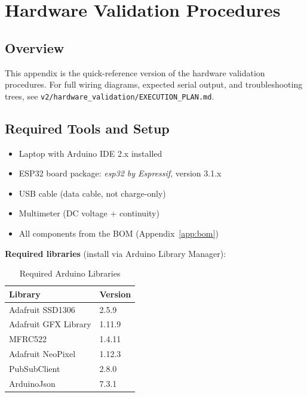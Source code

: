 \chapter{Hardware Validation Procedures}
\label{app:validation}

\section{Overview}

This appendix is the quick-reference version of the hardware validation procedures. For full wiring diagrams, expected serial output, and troubleshooting trees, see \texttt{v2/hardware\_validation/EXECUTION\_PLAN.md}.

\section{Required Tools and Setup}

\begin{itemize}[leftmargin=1.5em]
    \item Laptop with Arduino IDE 2.x installed
    \item ESP32 board package: \textit{esp32 by Espressif}, version 3.1.x
    \item USB cable (data cable, not charge-only)
    \item Multimeter (DC voltage + continuity)
    \item All components from the BOM (Appendix~\ref{app:bom})
\end{itemize}

\textbf{Required libraries} (install via Arduino Library Manager):

\begin{table}[H]
\centering
\caption{Required Arduino Libraries}
\begin{tabular}{L{5cm}C{3cm}}
\toprule
\textbf{Library} & \textbf{Version} \\
\midrule
Adafruit SSD1306 & 2.5.9 \\
Adafruit GFX Library & 1.11.9 \\
MFRC522 & 1.4.11 \\
Adafruit NeoPixel & 1.12.3 \\
PubSubClient & 2.8.0 \\
ArduinoJson & 7.3.1 \\
\bottomrule
\end{tabular}
\end{table}

